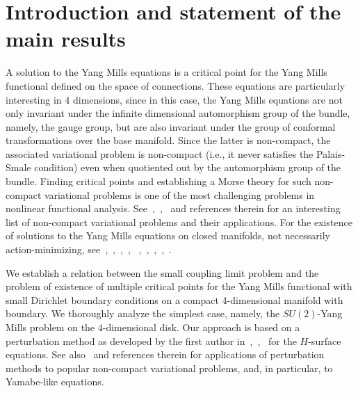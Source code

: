 \documentclass[11pt]{article}
\numberwithin{equation}{section} \setlength{\topmargin}{-35pt}
\begin{document}
\section{Introduction and statement of the main results}
A solution to the Yang Mills equations is a critical point for the
Yang Mills functional defined on the space of connections. These
equations are particularly interesting in $4$ dimensions, since in
this case, the Yang Mills equations are not only invariant under the
infinite dimensional automorphism group of the bundle, namely, the
gauge group, but are also invariant under the group of conformal
transformations over the base manifold. Since the latter is
non-compact, the associated variational  problem is non-compact
(i.e., it never satisfies the Palais-Smale condition) even when
quotiented out by the automorphism group of the bundle. Finding
critical points and establishing a Morse theory for such non-compact
variational problems is one of the most challenging problems in
nonlinear functional analysis.
See~\cite{Aubin},~\cite{Brezis},~\cite{Struwe} and references
therein for an interesting list of non-compact variational problems
and their applications. For the existence of solutions to the Yang
Mills equations on closed manifolds, not necessarily
action-minimizing,
see~\cite{Bor},~\cite{Parker},~\cite{Sadun},~\cite{SS},
~\cite{SSU},~\cite{Taubes1},~\cite{Taubes2},~\cite{Taubes3},~\cite{Wang}.

We establish a relation between the small coupling limit problem and
the problem of existence of multiple critical points for the Yang
Mills functional with small Dirichlet boundary conditions on a
compact 4-dimensional manifold with boundary. We thoroughly analyze
the simplest case, namely, the $SU(2)$-Yang Mills problem on the
$4$-dimensional disk. Our approach is based on a perturbation method
as developed by the first author in~\cite{I2},~\cite{I3},~\cite{I4}
for the $H$-surface equations. See also~\cite{AM} and references
therein for applications of perturbation methods to popular
non-compact variational problems, and, in particular, to Yamabe-like
equations.
\end{document}
